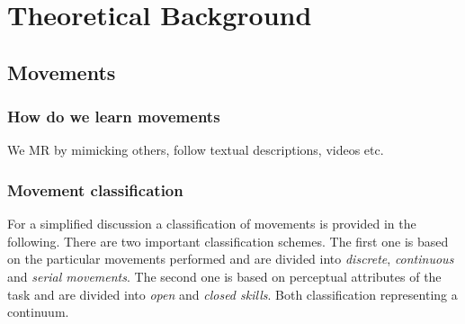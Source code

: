 \chapter{Theoretical Background}

\section{Movements}
\subsection{How do we learn movements}
We MR by mimicking others, follow textual descriptions, videos etc.

\subsection{Movement classification}
For a simplified discussion a classification of movements is provided in the following. There are two important classification schemes. The first one is based on the particular movements performed and are divided into \textit{discrete}, \textit{continuous} and \textit{serial movements}. The second one is based on perceptual attributes of the task and are divided into \textit{open} and \textit{closed skills}. Both classification representing a continuum.

